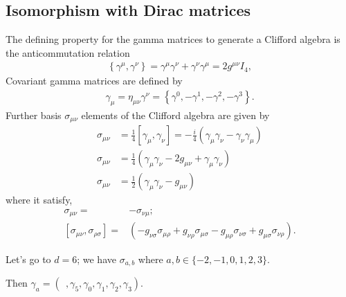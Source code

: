 \subsection{Isomorphism with Dirac matrices}
The defining property for the gamma matrices to generate a Clifford algebra is the anticommutation relation 
\begin{align}
    \left\{\gamma ^{\mu },\gamma ^{\nu }\right\}=\gamma ^{\mu }\gamma ^{\nu }+\gamma ^{\nu }\gamma ^{\mu }=2g ^{\mu \nu }I_{4},
\end{align}
Covariant gamma matrices are defined by
\begin{align}
    {\gamma _{\mu }=\eta _{\mu \nu }\gamma ^{\nu }=\left\{\gamma ^{0},-\gamma ^{1},-\gamma ^{2},-\gamma ^{3}\right\}.}
\end{align}
Further basis $\sigma _{\mu \nu }$ elements of the Clifford algebra are given by
\begin{align}
    \sigma _{\mu \nu }&={\frac {1}{4}}[\gamma _{\mu },\gamma _{\nu }]=-{\frac {i}{4}}(\gamma _{\mu }\gamma _{\nu }-\gamma _{\nu }\gamma _{\mu })\\
    \sigma _{\mu \nu }&={\frac {1}{4}}\left(\gamma _{\mu }\gamma _{\nu }-2g_{\mu\nu}+\gamma _{\mu }\gamma _{\nu }\right)\\
    \sigma _{\mu \nu }&={\frac {1}{2}}(\gamma _{\mu }\gamma _{\nu }-g_{\mu\nu})
\end{align}
where it satisfy,
\begin{align}
   \sigma_{\mu\nu}=&-\sigma_{\nu\mu};\\
   \left[\sigma _{\mu \nu },\sigma _{\rho \sigma }\right]=&\left(-g_{{\nu}{\sigma}}\sigma_{{\mu}{\rho}}+g_{{\nu}{\rho}}\sigma_{{\mu}{\sigma}}-g_{{\mu}{\rho}}\sigma_{{\nu}{\sigma}}+g_{{\mu}{\sigma}}\sigma_{{\nu}{\rho}}\right).
\end{align}

Let's go to $d=6$; we have $\sigma_{a,b}$ where $a,b\in\{-2,-1,0,1,2,3\}$.

Then $\gamma_a=(~~,\gamma_5,\gamma_0,\gamma_1,\gamma_2,\gamma_3)$.

